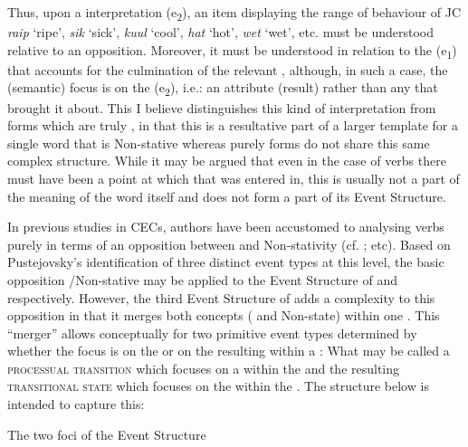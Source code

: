 Thus, upon a  interpretation (e\textsubscript{2}), an item displaying the range of behaviour of JC \textit{raip} `ripe’, \textit{sik} `sick’, \textit{kuul} `cool’, \textit{hat} `hot’, \textit{wet} `wet’, etc. must be understood relative to an opposition. Moreover, it must be understood in relation to the  (e\textsubscript{1}) that accounts for the culmination of the relevant , although, in such a case, the (semantic) focus is on the  (e\textsubscript{2}), i.e.: an attribute (result) rather than any  that brought it about. This I believe distinguishes this kind of  interpretation from forms which are truly , in that this  is a resultative part of a larger template for a single word that is Non-stative whereas purely  forms do not share this same complex structure. While it may be argued that even in the case of  verbs there must have been a point at which that  was entered in, this is usually not a part of the meaning of the word itself and does not form a part of its Event Structure.

In previous studies in CECs, authors have been accustomed to analysing verbs purely in terms of an opposition between  and Non-stativity (cf. \citealt{Bickerton1975,Jaganauth1987,Winford1993,Gooden2008}; etc). Based on Pustejovsky’s identification of three distinct event types at this level, the basic opposition \slash Non-stative may be applied to the Event Structure of  and  respectively. However, the third Event Structure of  adds a complexity to this opposition in that it merges both concepts ( and Non-state) within one . This ``merger'' allows conceptually for two primitive event types determined by whether the focus is on the  or on the resulting  within a : What may be called a \textsc{processual transition} which focuses on a  within the  and the resulting \textsc{transitional state} which focuses on the  within the . The structure below is intended to capture this:

 
\ea%
 \label{ex:5:13} 
 The two foci of the  Event Structure
 \begin{center}
\end{center}

